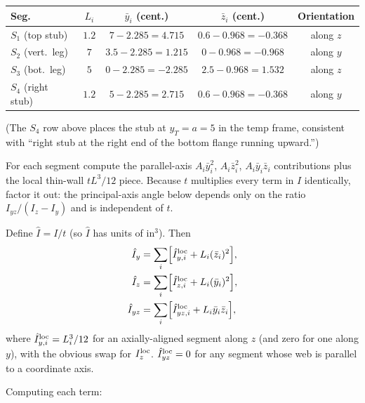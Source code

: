 \documentclass[11pt]{article}
\begin{document}
\begin{tabular}{lcccc}
\toprule
Seg.\ & $L_i$ & $\bar y_i$ (cent.) & $\bar z_i$ (cent.) & Orientation \\
\midrule
$S_1$ (top stub)    & $1.2$ & $7 - 2.285 = 4.715$  & $0.6 - 0.968 = -0.368$ & along $z$ \\
$S_2$ (vert.\ leg)  & $7$   & $3.5 - 2.285 = 1.215$ & $0 - 0.968 = -0.968$  & along $y$ \\
$S_3$ (bot.\ leg)   & $5$   & $0 - 2.285 = -2.285$  & $2.5 - 0.968 = 1.532$ & along $z$ \\
$S_4$ (right stub)  & $1.2$ & $5 - 2.285 = 2.715$   & $0.6 - 0.968 = -0.368$ & along $y$ \\
\bottomrule
\end{tabular}

(The $S_4$ row above places the stub at $y_T = a = 5$ in the temp frame, consistent with ``right stub at the right end of the bottom flange running upward.'')

For each segment compute the parallel-axis $A_i \bar y_i^2$, $A_i \bar z_i^2$, $A_i \bar y_i \bar z_i$ contributions plus the local thin-wall $tL^3/12$ piece. Because $t$ multiplies every term in $I$ identically, factor it out: the principal-axis angle below depends only on the ratio $I_{yz}/(I_z - I_y)$ and is independent of $t$.

Define $\hat I = I/t$ (so $\hat I$ has units of in$^3$). Then
\begin{align*}
\hat I_y &= \sum_i \Bigl[\hat I_{y,i}^{\rm loc} + L_i (\bar z_i)^2\Bigr],\\
\hat I_z &= \sum_i \Bigl[\hat I_{z,i}^{\rm loc} + L_i (\bar y_i)^2\Bigr],\\
\hat I_{yz} &= \sum_i \Bigl[\hat I_{yz,i}^{\rm loc} + L_i \bar y_i \bar z_i\Bigr],
\end{align*}
where $\hat I_{y,i}^{\rm loc} = L_i^3/12$ for an axially-aligned segment along $z$ (and zero for one along $y$), with the obvious swap for $I_z^{\rm loc}$. $\hat I_{yz}^{\rm loc} = 0$ for any segment whose web is parallel to a coordinate axis.

Computing each term:
\end{document}
